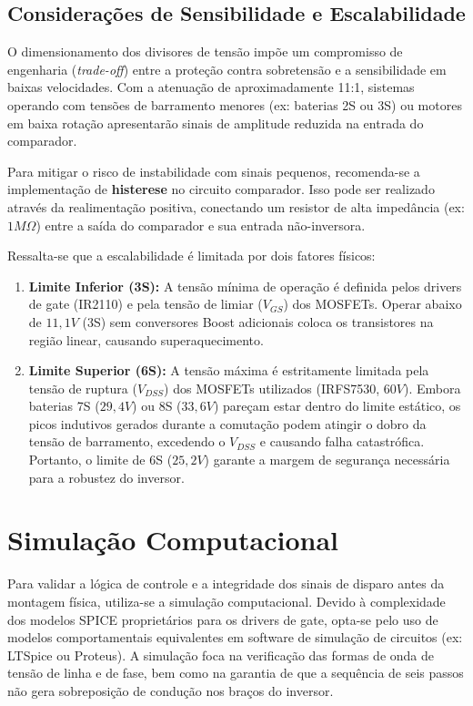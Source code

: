 \documentclass[12pt, a4paper, openright, oneside, brazilian]{abntex2}
\begin{document}
\subsection{Considerações de Sensibilidade e Escalabilidade}

O dimensionamento dos divisores de tensão impõe um compromisso de engenharia (\textit{trade-off}) entre a proteção contra sobretensão e a sensibilidade em baixas velocidades. Com a atenuação de aproximadamente 11:1, sistemas operando com tensões de barramento menores (ex: baterias 2S ou 3S) ou motores em baixa rotação apresentarão sinais de amplitude reduzida na entrada do comparador.

Para mitigar o risco de instabilidade com sinais pequenos, recomenda-se a implementação de \textbf{histerese} no circuito comparador. Isso pode ser realizado através da realimentação positiva, conectando um resistor de alta impedância (ex: $1M\Omega$) entre a saída do comparador e sua entrada não-inversora.

Ressalta-se que a escalabilidade é limitada por dois fatores físicos:
\begin{enumerate}
    \item \textbf{Limite Inferior (3S):} A tensão mínima de operação é definida pelos drivers de gate (IR2110) e pela tensão de limiar ($V_{GS}$) dos MOSFETs. Operar abaixo de $11,1V$ (3S) sem conversores Boost adicionais coloca os transistores na região linear, causando superaquecimento.
    \item \textbf{Limite Superior (6S):} A tensão máxima é estritamente limitada pela tensão de ruptura ($V_{DSS}$) dos MOSFETs utilizados (IRFS7530, $60V$). Embora baterias 7S ($29,4V$) ou 8S ($33,6V$) pareçam estar dentro do limite estático, os picos indutivos gerados durante a comutação podem atingir o dobro da tensão de barramento, excedendo o $V_{DSS}$ e causando falha catastrófica. Portanto, o limite de 6S ($25,2V$) garante a margem de segurança necessária para a robustez do inversor.
\end{enumerate}

\section{Simulação Computacional}
Para validar a lógica de controle e a integridade dos sinais de disparo antes da montagem física, utiliza-se a simulação computacional. Devido à complexidade dos modelos SPICE proprietários para os drivers de gate, opta-se pelo uso de modelos comportamentais equivalentes em software de simulação de circuitos (ex: LTSpice ou Proteus). A simulação foca na verificação das formas de onda de tensão de linha e de fase, bem como na garantia de que a sequência de seis passos não gera sobreposição de condução nos braços do inversor.
\end{document}
